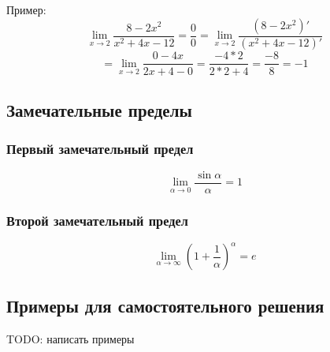 \documentclass[12pt,a4paper]{article}
\begin{document}
Пример:
$$ \lim_{x \to 2}\frac{8-2x^2}{x^2+4x-12}=\frac{0}{0}=\lim_{x \to 2}\frac{(8-2x^2)'}{(x^2+4x-12)'}$$ 
$$=\lim_{x \to 2}\frac{0-4x}{2x+4-0} = \frac{-4 * 2}{2 * 2 + 4} = \frac{-8}{8} = -1$$
\subsection{Замечательные пределы}
\subsubsection{Первый замечательный предел}
$$ \lim_{\alpha \to 0} \frac{\sin \alpha}{\alpha} = 1 $$
\subsubsection{Второй замечательный предел} 
$$ \lim_{\alpha \to \infty}(1 + \frac{1}{\alpha})^\alpha = e $$
\subsection{Примеры для самостоятельного решения}
TODO: написать примеры
\end{document}
